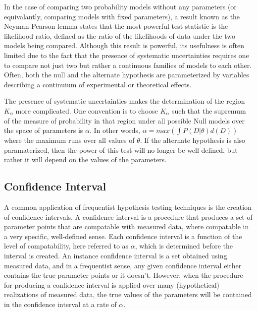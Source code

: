 In the case of comparing two probability models without any parameters (or equivalantly, comparing models with fixed parameters), a result known as the Neyman-Pearson lemma states that the most powerful test statistic is the likelihood ratio, defined as the ratio of the likelihoods of data under the two models being compared.
Although this result is powerful, its usefulness is often limited due to the fact that the presence of systematic uncertainties requires one to compare not just two but rather a continuous families of models to each other.
Often, both the null and the alternate hypothesis are parameterized by variables describing a continuium of experimental or theoretical effects.

The presence of systematic uncertainties makes the determination of the region $K_{\alpha}$ more complicated.
One convention is to choose $K_{\alpha}$ such that the supremum of the measure of probability in that region under all possible Null models over the space of parameters is $\alpha$.
In other words, $\alpha = max( \int P(D|\theta) d(D) )$ where the maximum runs over all values of $\theta$.
If the alternate hypothesis is also paramaterized, then the power of this test will no longer be well defined, but rather it will depend on the values of the parameters.


\subsection{Confidence Interval}

A common application of frequentist hypothesis testing techniques is the creation of confidence intervals.
A confidence interval is a procedure that produces a set of parameter points that are compatable with measured data, where compatable  in a very specific, well-defined sense.
Each confidence interval is a function of the level of compatability, here referred to as $\alpha$, which is determined before the interval is created.
An instance confidence interval is a set obtained using measured data, and in a frequentist sense, any given confidence interval either contains the true parameter points or it doesn't.
However, when the procedure for producing a confidence interval is applied over many (hypothetical) realizations of measured data, the true values of the parameters will be contained in the confidence interval at a rate of $\alpha$.


